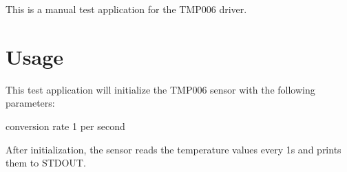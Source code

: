 This is a manual test application for the T\+M\+P006 driver.

\section*{Usage}

This test application will initialize the T\+M\+P006 sensor with the following parameters\+:
\begin{DoxyItemize}
\item conversion rate 1 per second
\end{DoxyItemize}

After initialization, the sensor reads the temperature values every 1s and prints them to S\+T\+D\+O\+UT. 